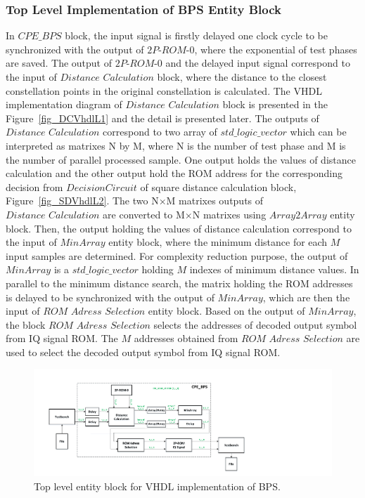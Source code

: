 \begin{refsection}
\subsubsection{Top Level Implementation of BPS Entity Block}

In $\textit{CPE\_BPS}$ block, the input signal is firstly delayed one clock cycle to be synchronized with the output of $\textit{2P-ROM-0}$, where the exponential of test phases are saved. The output of $\textit{2P-ROM-0}$ and the delayed input signal correspond to the input of $\textit{Distance Calculation}$ block, where the distance to the closest constellation points in the original constellation is calculated. The VHDL implementation diagram of $\textit{Distance Calculation}$ block is presented in the Figure~\ref{fig_DCVhdlL1} and the detail is presented later. The outputs of $\textit{Distance Calculation}$ correspond to two array of $\textit{std\_logic\_vector}$ which can be interpreted as matrixes N by M, where N is the number of test phase and M is the number of parallel processed sample. One output holds the values of distance calculation and the other output hold the ROM address for the corresponding decision from $Decision Circuit$ of square distance calculation block, Figure~\ref{fig_SDVhdlL2}.
The two N$\times$M matrixes outputs of $\textit{Distance Calculation}$ are converted to M$\times$N matrixes using $\textit{Array2Array}$ entity block. Then, the output holding the values of distance calculation correspond to the input of $\textit{MinArray}$ entity block, where the minimum distance for each $M$ input samples are determined. For complexity reduction purpose, the output of $\textit{MinArray}$ is a $\textit{std\_logic\_vector}$ holding $M$ indexes of minimum distance values. In parallel to the minimum distance search, the matrix holding the ROM addresses is delayed to be synchronized with the output of $\textit{MinArray}$, which are then the input of $\textit{ROM Adress Selection}$ entity block. Based on the output of $\textit{MinArray}$, the block $\textit{ROM Adress Selection}$ selects the addresses of decoded output symbol from IQ signal ROM. The $M$ addresses obtained from $\textit{ROM Adress Selection}$ are used to select the decoded output symbol from IQ signal ROM.


\begin{figure}[h!]
    \centering
    \includegraphics[width=15cm]{./sdf/dsp_laser_phase_compensation/figures/cpe_bps.pdf}
    \caption{Top level entity block for VHDL implementation of BPS.}
    \label{fig_cpeVhdlL0}
\end{figure}


\end{refsection}
